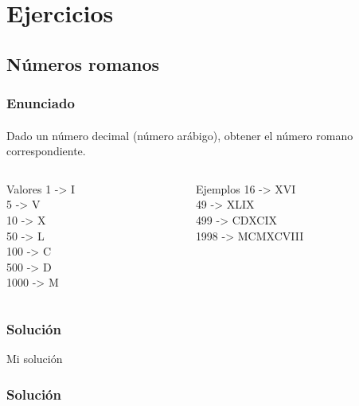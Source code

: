  \section{Ejercicios}

  \subsection{Números romanos}

  \begin{frame}
   \frametitle{Enunciado}
   \framesubtitle{}

   Dado un número decimal (número arábigo), obtener el número romano
   correspondiente.

   \begin{columns}
    \begin{column}{4cm}
     \begin{exampleblock}
      {Valores}
      {
      1 -> I\\
      5 -> V\\
      10 -> X\\
      50 -> L\\
      100 -> C\\
      500 -> D\\
      1000 -> M\\
      }
     \end{exampleblock}

    \end{column}
    \begin{column}{4cm}
     \begin{exampleblock}
      {Ejemplos}
      {
      16 -> XVI\\
      49 -> XLIX \\
      499 -> CDXCIX \\
      1998 -> MCMXCVIII\\
      }
     \end{exampleblock}
    \end{column}
   \end{columns}

  \end{frame}

  \begin{frame}
   \frametitle{Solución}
   \huge {Mi solución}
  \end{frame}

  \begin{frame}
   \frametitle{Solución}

   \begin{testfail}
    
   \end{testfail}

  \end{frame}

